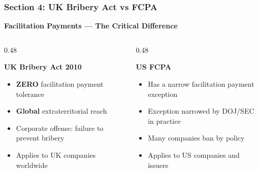 \documentclass[12pt,aspectratio=169]{beamer}
\renewcommand{\scriptsize}{\fontsize{5}{6}\selectfont}
\begin{document}
	\begin{frame}
		\frametitle{\fontsize{13}{15}\selectfont \textbf{Section 4: UK Bribery Act vs FCPA}}
		\vspace{0.3cm}
		\begin{center}
			{\fontsize{12}{14}\selectfont \textbf{Facilitation Payments — The Critical Difference}}
		\end{center}
		\vspace{0.2cm}
		\begin{columns}[T]
			\begin{column}{0.48\textwidth}
				\begin{block}{\textbf{UK Bribery Act 2010}}
					\scriptsize
					\begin{itemize}
						\item \textbf{ZERO} facilitation payment tolerance
						\item \textbf{Global} extraterritorial reach
						\item Corporate offense: failure to prevent bribery
						\item Applies to UK companies worldwide
					\end{itemize}
				\end{block}
			\end{column}
			\begin{column}{0.48\textwidth}
				\begin{block}{\textbf{US FCPA}}
					\scriptsize
					\begin{itemize}
						\item Has a narrow facilitation payment exception
						\item Exception narrowed by DOJ/SEC in practice
						\item Many companies ban by policy
						\item Applies to US companies and issuers
					\end{itemize}
				\end{block}
			\end{column}
		\end{columns}
	\end{frame}
	
\end{document}
